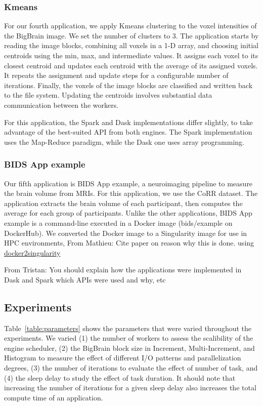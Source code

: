 \documentclass[conference]{IEEEtran}
\newcommand{\TG}[1]{\color{cyan}From Tristan: #1 \color{black}}
\newcommand{\MD}[1]{\color{magenta}From Mathieu: #1 \color{black}}
\begin{document}
\subsubsection{Kmeans}
For our fourth application, we apply Kmeans clustering to the voxel
intensities of the BigBrain image. We set the number of clusters to 3. The
application starts by reading the image blocks, combining all voxels in a
1-D array, and choosing initial centroids using the min, max, and
intermediate values. It assigns each voxel to its closest centroid and
updates each centroid with the average of its assigned voxels. It repeats
the assignment and update steps for a configurable number of iterations.
Finally, the voxels of the image blocks are classified and written back to
the file system. Updating the centroids involves substantial data
communication between the workers.

For this application, the Spark and Dask implementations differ slightly,
to take advantage of the best-suited API from both engines. The Spark
implementation uses the Map-Reduce paradigm, while the Dask one uses array
programming.
	
	
\subsubsection{BIDS App example}
Our fifth application is BIDS App example, a neuroimaging pipeline to
measure the brain volume from MRIs. For this application, we use the CoRR
dataset. The application extracts the brain volume of each participant,
then computes the average for each group of participants. Unlike the other
applications, BIDS App example is a command-line executed in a Docker image
(bids/example on DockerHub). We converted the Docker image to a Singularity
image for use in HPC environments, \MD{Cite paper on reason why this is
done.} using
\href{https://hub.docker.com/r/singularityware/docker2singularity/tags/}{docker2singularity}

\TG{You should explain how the applications were implemented in Dask and
Spark which APIs were used and why, etc}

\subsection{Experiments}
Table~\ref{table:parameters} shows the parameters that were varied
throughout the experiments. We varied (1) the number of workers to assess
the scalibility of the engine scheduler, (2) the BigBrain
block size in Increment, Multi-Increment, and Histogram to measure the
effect of different I/O patterns and parallelization degrees, (3) the
number of iterations to evaluate the effect of number of task, and (4) the
sleep delay to study the effect of task duration. It should note that
increasing the number of iterations for a given sleep delay also increases
the total compute time of an application.
\end{document}

